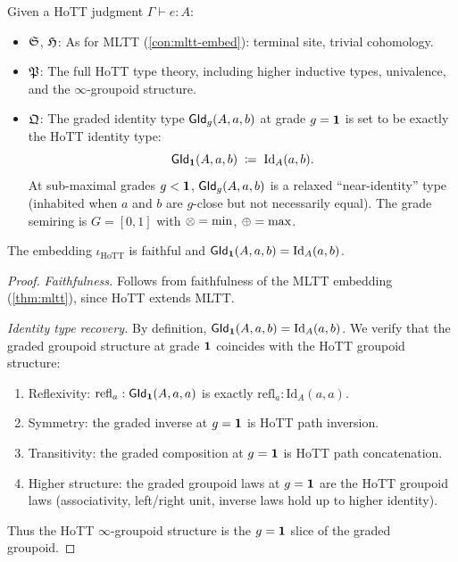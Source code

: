 \begin{construction}
\label{con:hott-embed}
Given a HoTT judgment $\Gamma \vdash e : A$:
\begin{itemize}[nosep]
\item $\mathfrak{S}$, $\mathfrak{H}$: As for MLTT (\cref{con:mltt-embed}):
  terminal site, trivial cohomology.

\item $\mathfrak{P}$: The full HoTT type theory, including higher inductive
  types, univalence, and the $\infty$-groupoid structure.

\item $\mathfrak{Q}$: The graded identity type $\mathsf{GId}_g(A,a,b)$ at grade
  $g = \mathbf{1}$ is set to be exactly the HoTT identity type:
  \[
    \mathsf{GId}_{\mathbf{1}}(A,a,b) \;\coloneqq\; \mathrm{Id}_A(a,b).
  \]
  At sub-maximal grades $g < \mathbf{1}$, $\mathsf{GId}_g(A,a,b)$ is a
  relaxed ``near-identity'' type (inhabited when $a$ and $b$ are
  $g$-close but not necessarily equal).  The grade semiring is
  $G = [0,1]$ with $\otimes = \min$, $\oplus = \max$.
\end{itemize}
\end{construction}

\begin{theorem}
\label{thm:hott}
The embedding $\iota_{\mathrm{HoTT}}$ is faithful and
$\mathsf{GId}_{\mathbf{1}}(A,a,b) = \mathrm{Id}_A(a,b)$.
\end{theorem}

\begin{proof}
\emph{Faithfulness.}  Follows from faithfulness of the MLTT embedding
(\cref{thm:mltt}), since HoTT extends MLTT.

\emph{Identity type recovery.}
By definition, $\mathsf{GId}_{\mathbf{1}}(A,a,b) = \mathrm{Id}_A(a,b)$.  We
verify that the graded groupoid structure at grade $\mathbf{1}$
coincides with the HoTT groupoid structure:
\begin{enumerate}[label=(\roman*),nosep]
\item Reflexivity: $\mathrm{refl}_a : \mathsf{GId}_{\mathbf{1}}(A,a,a)$ is
  exactly $\mathrm{refl}_a : \mathrm{Id}_A(a,a)$.
\item Symmetry: the graded inverse at $g = \mathbf{1}$ is HoTT path
  inversion.
\item Transitivity: the graded composition at $g = \mathbf{1}$ is HoTT
  path concatenation.
\item Higher structure: the graded groupoid laws at $g = \mathbf{1}$
  are the HoTT groupoid laws (associativity, left/right unit,
  inverse laws hold up to higher identity).
\end{enumerate}
Thus the HoTT $\infty$-groupoid structure is the $g = \mathbf{1}$ slice
of the graded groupoid.
\end{proof}

